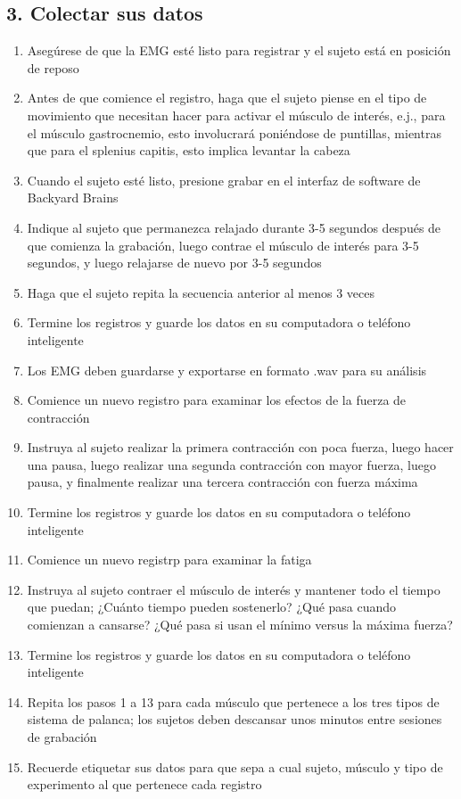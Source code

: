 \documentclass[12pt]{article}
\begin{document}
\subsection*{3. Colectar sus datos}

\begin{enumerate}
\item Asegúrese de que la EMG esté listo para registrar y el sujeto
  está en posición de reposo
\item Antes de que comience el registro, haga que el sujeto piense en
  el tipo de movimiento que necesitan hacer para activar el músculo de
  interés, e.j., para el músculo gastrocnemio, esto involucrará
  poniéndose de puntillas, mientras que para el splenius capitis, esto
  implica levantar la cabeza
\item Cuando el sujeto esté listo, presione grabar en el interfaz de
  software de Backyard Brains
\item Indique al sujeto que permanezca relajado durante 3-5 segundos
  después de que comienza la grabación, luego contrae el músculo de
  interés para 3-5 segundos, y luego relajarse de nuevo por 3-5
  segundos
\item Haga que el sujeto repita la secuencia anterior al menos 3 veces
\item Termine los registros y guarde los datos en su computadora o
  teléfono inteligente
\item Los EMG deben guardarse y exportarse en formato .wav para su
  análisis
\item Comience un nuevo registro para examinar los efectos de la fuerza
  de contracción
\item Instruya al sujeto realizar la primera contracción con poca
  fuerza, luego hacer una pausa, luego realizar una segunda
  contracción con mayor fuerza, luego pausa, y finalmente realizar una
  tercera contracción con fuerza máxima
\item Termine los registros y guarde los datos en su computadora o
  teléfono inteligente
\item Comience un nuevo registrp para examinar la fatiga
\item Instruya al sujeto contraer el músculo de interés y
  mantener todo el tiempo que puedan; ¿Cuánto tiempo pueden
  sostenerlo? ¿Qué pasa cuando comienzan a cansarse? ¿Qué pasa si
  usan el mínimo versus la máxima fuerza?
\item Termine los registros y guarde los datos en su computadora o
  teléfono inteligente
\item Repita los pasos 1 a 13 para cada músculo que pertenece a los
  tres tipos de sistema de palanca; los sujetos deben descansar
  unos minutos entre sesiones de grabación
\item Recuerde etiquetar sus datos para que sepa a cual sujeto,
  músculo y tipo de experimento al que pertenece cada registro
\end{enumerate}
\end{document}
